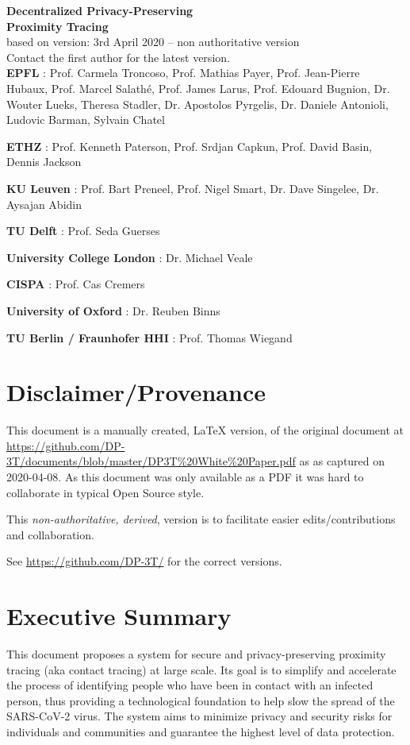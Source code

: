 \documentclass[12pt,a4paper]{article}
\begin{document}
\thispagestyle{specialfooter}
\onehalfspace

\begin{center}{\bfseries\Large
Decentralized Privacy-Preserving\\
Proximity Tracing}\\[0.5cm]
 based on version: 3rd April 2020 -- non authoritative version \\
Contact the first author for the latest version.\\[1cm]
\textbf{EPFL} : Prof. Carmela Troncoso, Prof. Mathias Payer, Prof. Jean-Pierre\\
Hubaux, Prof. Marcel Salathé, Prof. James Larus, Prof. Edouard
Bugnion, Dr. Wouter Lueks, Theresa Stadler, Dr. Apostolos Pyrgelis, Dr.
Daniele Antonioli, Ludovic Barman, Sylvain Chatel

\textbf{ETHZ} : Prof. Kenneth Paterson, Prof. Srdjan Capkun, Prof. David Basin,
Dennis Jackson

\textbf{KU Leuven} : Prof. Bart Preneel, Prof. Nigel Smart, Dr. Dave Singelee,
Dr. Aysajan Abidin

\textbf{TU Delft} : Prof. Seda Guerses

\textbf{University College London} : Dr. Michael Veale

\textbf{CISPA} : Prof. Cas Cremers

\textbf{University of Oxford} : Dr. Reuben Binns

\textbf{TU Berlin / Fraunhofer HHI} : Prof. Thomas Wiegand
\end{center}
\clearpage
\singlespace

\pagebreak

\section*{Disclaimer/Provenance}

This document is a manually created, LaTeX version, of the original document at \url{https://github.com/DP-3T/documents/blob/master/DP3T\%20White\%20Paper.pdf} as 
as captured on 2020-04-08. As this document was only available as a PDF it was hard to collaborate in typical Open Source style.

This\emph{ non-authoritative, derived}, version is to facilitate easier edits/contributions and collaboration.

See \url{https://github.com/DP-3T/} for the correct versions.

\pagebreak

\section*{Executive Summary}
This document proposes a system for secure and privacy-preserving proximity tracing (aka
contact tracing) at large scale. Its goal is to simplify and accelerate the process of identifying people who have been in contact with an infected person, thus providing a technological foundation to help slow the spread of the SARS-CoV-2 virus. The system aims to minimize privacy and security risks for individuals and communities and guarantee the highest level of data protection.
\end{document}
